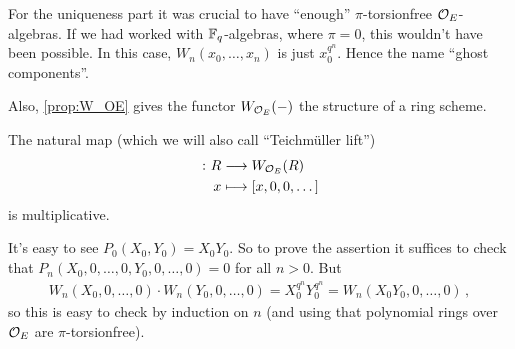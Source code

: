 \documentclass[a4paper, 10pt, oneside, DIV=9, chapterprefix=true, numbers=enddot,bibliography=totoc]{scrbook}
\begin{document}
\begin{urem}
	\begin{numerate}
		\item For the uniqueness part it was crucial to have \enquote{enough} $\pi$-torsionfree $\mathcal{O}_E$-algebras. If we had worked with $\mathbb{F}_q$-algebras, where $\pi=0$, this wouldn't have been possible. In this case, $W_n(x_0,\dotsc,x_n)$ is just $x_0^{q^n}$. Hence the name \enquote{ghost components}.
		
		\item Also, \cref{prop:W_OE} gives the functor $W_{\mathcal{O}_E}(-)$ the structure of a ring scheme.
	\end{numerate}
\end{urem}	
\begin{lem}\label{lem:W_OETeichmüller}
	The natural map (which we will also call \enquote{Teichmüller lift})
	\begin{align*}
		[-]\colon R&\morphism W_{\Oo_E}(R)\\
		x&\longmapsto [x,0,0,\dotsc]
	\end{align*}
	is multiplicative.
\end{lem}
\begin{proof*}
	It's easy to see $P_0(X_0,Y_0)=X_0Y_0$. So to prove the assertion it suffices to check that $P_n(X_0,0,\dotsc,0,Y_0,0,\dotsc,0)=0$ for all $n>0$. But
	\begin{align*}
		W_n(X_0,0,\dotsc,0)\cdot W_n(Y_0,0,\dotsc,0)=X_0^{q^n}Y_0^{q^n}=W_n(X_0Y_0,0,\dotsc,0)\,,
	\end{align*}
	so this is easy to check by induction on $n$ (and using that polynomial rings over $\mathcal{O}_E$ are $\pi$-torsionfree).
\end{proof*}
\end{document}
